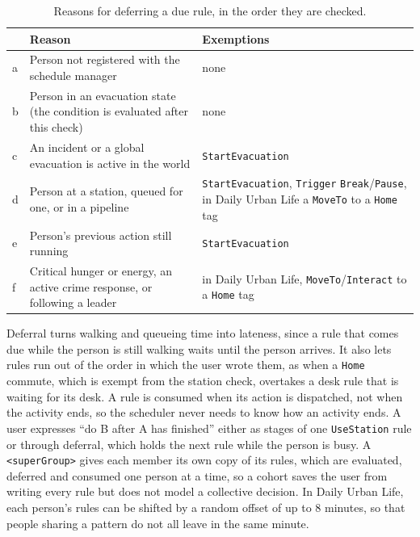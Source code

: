 \begin{table}[H]
\centering
\small\renewcommand{\arraystretch}{1.15}
\begin{tabularx}{\textwidth}{|l|L{6.0cm}|>{\raggedright\arraybackslash}X|}
\hline
{} & \textbf{Reason} & \textbf{Exemptions} \\
\hline
a & Person not registered with the schedule manager & none \\ \hline
b & Person in an evacuation state (the condition is evaluated after this check) & none \\ \hline
c & An incident or a global evacuation is active in the world & \texttt{StartEvacuation} \\ \hline
d & Person at a station, queued for one, or in a pipeline & \texttt{StartEvacuation}, \texttt{Trigger} \texttt{Break}/\texttt{Pause}, in Daily Urban Life a \texttt{MoveTo} to a \texttt{Home} tag \\ \hline
e & Person's previous action still running & \texttt{StartEvacuation} \\ \hline
f & Critical hunger or energy, an active crime response, or following a leader & in Daily Urban Life, \texttt{MoveTo}/\texttt{Interact} to a \texttt{Home} tag \\ \hline
\end{tabularx}
\caption[Reasons for deferring a due rule]{Reasons for deferring a due rule, in the order they are checked.}
\label{tab:deferral}
\end{table}

Deferral turns walking and queueing time into lateness, since a rule that comes due while the person is still walking waits until the person arrives. It also lets rules run out of the order in which the user wrote them, as when a \texttt{Home} commute, which is exempt from the station check, overtakes a desk rule that is waiting for its desk. A rule is consumed when its action is dispatched, not when the activity ends, so the scheduler never needs to know how an activity ends. A user expresses ``do B after A has finished'' either as stages of one \texttt{UseStation} rule or through deferral, which holds the next rule while the person is busy. A \texttt{<superGroup>} gives each member its own copy of its rules, which are evaluated, deferred and consumed one person at a time, so a cohort saves the user from writing every rule but does not model a collective decision. In Daily Urban Life, each person's rules can be shifted by a random offset of up to 8 minutes, so that people sharing a pattern do not all leave in the same minute.

